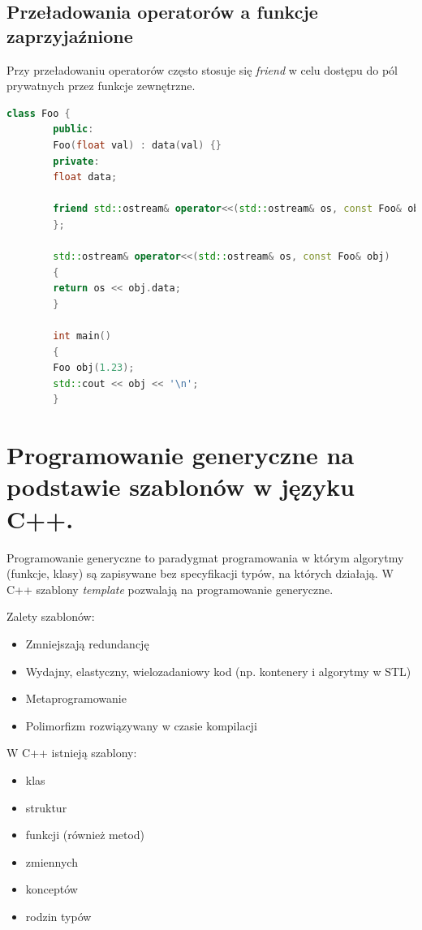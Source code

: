 \documentclass[12pt]{article}
\begin{document}
    \newpage
    \subsection{Przeładowania operatorów a funkcje zaprzyjaźnione}
    Przy przeładowaniu operatorów często stosuje się \textit{friend} w celu dostępu do pól prywatnych przez funkcje zewnętrzne.


    \begin{lstlisting}[language=C++]
        class Foo {
        public:
        Foo(float val) : data(val) {}
        private:
        float data;

        friend std::ostream& operator<<(std::ostream& os, const Foo& obj)
        };

        std::ostream& operator<<(std::ostream& os, const Foo& obj)
        {
        return os << obj.data;
        }

        int main()
        {
        Foo obj(1.23);
        std::cout << obj << '\n';
        }
    \end{lstlisting}

    \newpage

    \section{Programowanie generyczne na podstawie szablonów w języku C++.}

    Programowanie generyczne to paradygmat programowania w którym algorytmy (funkcje, klasy)
    są zapisywane bez specyfikacji typów, na których działają.
    W C++ szablony \textit{template} pozwalają na programowanie generyczne.

    Zalety szablonów:
    \begin{itemize}
        \item Zmniejszają redundancję
        \item Wydajny, elastyczny, wielozadaniowy kod (np. kontenery i algorytmy
        w STL)
        \item Metaprogramowanie
        \item Polimorfizm rozwiązywany w czasie kompilacji
    \end{itemize}

    W C++ istnieją szablony:
    \begin{itemize}
        \item klas
        \item struktur
        \item funkcji (również metod)
        \item zmiennych
        \item konceptów
        \item rodzin typów
    \end{itemize}
\end{document}
